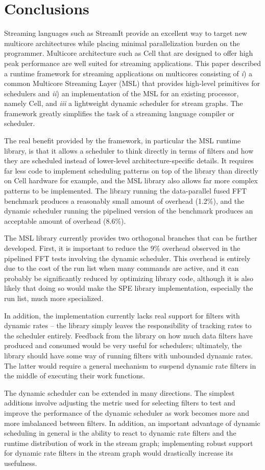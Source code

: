 \section{Conclusions}\label{ch:conc}

Streaming languages such as StreamIt provide an excellent way to
target new multicore architectures while placing minimal
parallelization burden on the programmer. Multicore architecture such
as Cell that are designed to offer high peak performance are well
suited for streaming applications. This paper described a runtime
framework for streaming applications on multicores consisting of
\emph{i}) a common Multicore Streaming Layer (MSL) that provides
high-level primitives for schedulers and \emph{ii}) an implementation
of the MSL for an existing processor, namely Cell, and \emph{iii} a
lightweight dynamic scheduler for stream graphs. The framework greatly
simplifies the task of a streaming language compiler or scheduler.

The real benefit provided by the framework, in particular the MSL
runtime library, is that it allows a scheduler to think directly in
terms of filters and how they are scheduled instead of lower-level
architecture-specific details. It requires far less code to implement
scheduling patterns on top of the library than directly on Cell
hardware for example, and the MSL library also allows far more complex
patterns to be implemented. The library running the data-parallel
fused FFT benchmark produces a reasonably small amount of overhead
(1.2\%), and the dynamic scheduler running the pipelined version of
the benchmark produces an acceptable amount of overhead (8.6\%).

The MSL library currently provides two orthogonal branches that can be
further developed. First, it is important to reduce the 9\% overhead
observed in the pipelined FFT tests involving the dynamic
scheduler. This overhead is entirely due to the cost of the run list
when many commands are active, and it can probably be significantly
reduced by optimizing library code, although it is also likely that
doing so would make the SPE library implementation, especially the run
list, much more specialized.

In addition, the implementation currently lacks real support for
filters with dynamic rates -- the library simply leaves the
responsibility of tracking rates to the scheduler entirely. Feedback
from the library on how much data filters have produced and consumed
would be very useful for schedulers; ultimately, the library should
have some way of running filters with unbounded dynamic rates. The
latter would require a general mechanism to suspend dynamic rate
filters in the middle of executing their work functions.

The dynamic scheduler can be extended in many directions. The simplest
additions involve adjusting the metric used for selecting filters to
test and improve the performance of the dynamic scheduler as work
becomes more and more imbalanced between filters. In addition, an
important advantage of dynamic scheduling in general is the ability to
react to dynamic rate filters and the runtime distribution of work in
the stream graph; implementing robust support for dynamic rate filters
in the stream graph would drastically increase its usefulness.
